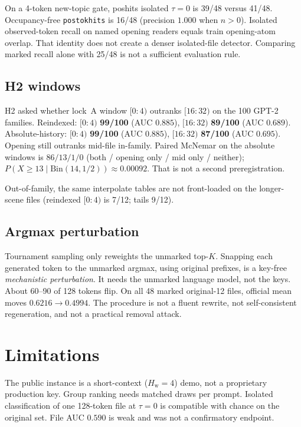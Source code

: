 \documentclass[11pt,a4paper]{article}
\theoremstyle{definition}
\newcommand{\Hw}{H_{\mathrm{w}}}
\newcommand{\Ktop}{K}
\begin{document}
On a 4-token new-topic gate, poshits isolated $\tau=0$ is 39/48 versus
41/48. Occupancy-free \texttt{postokhits} is 16/48 (precision $1.000$
when $n>0$). Isolated observed-token recall on named opening readers
equals train opening-atom overlap. That identity does not create a
denser isolated-file detector. Comparing marked recall alone with 25/48
is not a sufficient evaluation rule.

\subsection{H2 windows}

H2 asked whether lock~A window $[0{:}4)$ outranks $[16{:}32)$ on the 100
GPT-2 families. Reindexed: $[0{:}4)$ \textbf{99/100} (AUC $0.885$),
$[16{:}32)$ \textbf{89/100} (AUC $0.689$). Absolute-history:
$[0{:}4)$ \textbf{99/100} (AUC $0.885$), $[16{:}32)$ \textbf{87/100}
(AUC $0.695$). Opening still outranks mid-file in-family. Paired
McNemar on the absolute windows is $86/13/1/0$ (both / opening
only / mid only / neither);
$P(X\ge 13\mid \mathrm{Bin}(14,1/2))\approx 0.00092$. That is not a
second preregistration.

Out-of-family, the same interpolate tables are not front-loaded on
the longer-scene files (reindexed $[0{:}4)$ is 7/12; tails 9/12).

\subsection{Argmax perturbation}
\label{sec:scrub}

Tournament sampling only reweights the unmarked top-$\Ktop$. Snapping
each generated token to the unmarked argmax, using original prefixes,
is a key-free \emph{mechanistic perturbation}. It needs the unmarked
language model, not the keys. About 60--90 of 128 tokens flip. On all 48
marked original-12 files, official mean moves $0.6216\to 0.4994$. The
procedure is not a fluent rewrite, not self-consistent regeneration,
and not a practical removal attack.

\FloatBarrier
\section{Limitations}
\label{sec:limits}

The public instance is a short-context ($\Hw=4$) demo, not a proprietary
production key. Group ranking needs matched draws per prompt. Isolated
classification of one 128-token file at $\tau=0$ is compatible with
chance on the original set. File AUC $0.590$ is weak and was not a confirmatory
endpoint.
\end{document}

